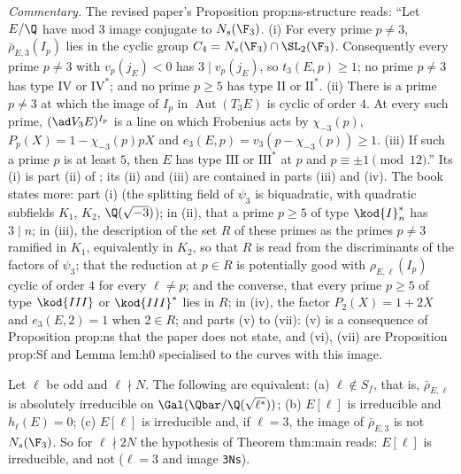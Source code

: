 \begin{paperlink}
\emph{Commentary.} The revised paper's Proposition prop:ns-structure reads: ``Let $E/\Q$ have mod $3$ image conjugate to $N_s(\F_3)$. (i) For every
prime $p\ne3$, $\bar\rho_{E,3}(I_p)$ lies in the cyclic group $C_4=N_s(\F_3)\cap\SL_2(\F_3)$. Consequently every prime $p\ne3$ with $v_p(j_E)<0$ has $3\mid v_p(j_E)$,
so $t_3(E,p)\ge1$; no prime $p\ne3$ has type $\mathrm{IV}$ or $\mathrm{IV}^*$; and no prime $p\ge5$ has type $\mathrm{II}$ or $\mathrm{II}^*$. (ii) There is a
prime $p\ne3$ at which the image of $I_p$ in $\operatorname{Aut}(T_3E)$ is cyclic of order $4$. At every such prime, $(\ad V_3E)^{I_p}$ is a line on which
Frobenius acts by $\chi_{-3}(p)$, $P_p(X)=1-\chi_{-3}(p)pX$ and $e_3(E,p)=v_3(p-\chi_{-3}(p))\ge1$. (iii) If such a prime $p$ is at least $5$, then $E$ has type
$\mathrm{III}$ or $\mathrm{III}^*$ at $p$ and $p\equiv\pm1\pmod{12}$.'' Its (i) is part (ii) of ; its (ii) and (iii) are contained
in parts (iii) and (iv). The book states more: part (i) (the splitting field of $\psi_3$ is biquadratic, with quadratic subfields
$K_1$, $K_2$, $\Q(\sqrt{-3})$); in (ii), that a prime $p\ge5$ of type $\kod{I}_n^*$ has $3\mid n$; in (iii), the description of the set $R$ of these primes as the
primes $p\ne3$ ramified in $K_1$, equivalently in $K_2$, so that $R$ is read from the discriminants of the factors of $\psi_3$; that the reduction at $p\in R$
is potentially good with $\rho_{E,\ell}(I_p)$ cyclic of order $4$ for every $\ell\ne p$; and the converse, that every prime $p\ge5$ of type $\kod{III}$ or
$\kod{III}^*$ lies in $R$; in (iv), the factor $P_2(X)=1+2X$ and $e_3(E,2)=1$ when $2\in R$; and parts (v) to (vii): (v) is a consequence of Proposition prop:ns
that the paper does not state, and (vi), (vii) are Proposition prop:Sf and Lemma lem:h0 specialised to the curves with this image.
\end{paperlink}

\begin{corollary}\label{cor:galrep:Sf}
Let $\ell$ be odd and $\ell\nmid N$. The following are equivalent: (a) $\ell\notin S_f$, that is, $\bar\rho_{E,\ell}$ is absolutely irreducible on $\Gal(\Qbar/\Q(\sqrt{\ell^*}))$;
(b) $E[\ell]$ is irreducible and $h_\ell(E)=0$; (c) $E[\ell]$ is irreducible and, if $\ell=3$, the image of $\bar\rho_{E,3}$ is not $N_s(\F_3)$. So for $\ell\nmid2N$ the hypothesis of
Theorem thm:main reads: $E[\ell]$ is irreducible, and not ($\ell=3$ and image \texttt{3Ns}).
\end{corollary}

